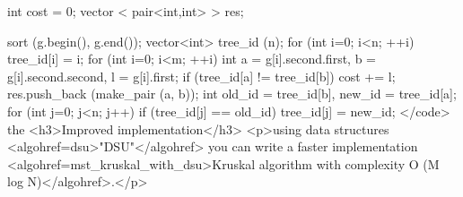int cost = 0;
vector < pair<int,int> > res;

sort (g.begin(), g.end());
vector<int> tree_id (n);
for (int i=0; i<n; ++i)
tree_id[i] = i;
for (int i=0; i<m; ++i)
{
int a = g[i].second.first, b = g[i].second.second, l = g[i].first;
if (tree_id[a] != tree_id[b])
{
cost += l;
res.push_back (make_pair (a, b));
int old_id = tree_id[b], new_id = tree_id[a];
for (int j=0; j<n; j++)
if (tree_id[j] == old_id)
tree_id[j] = new_id;
}
}</code>
the <h3>Improved implementation</h3>
<p>using data structures <algohref=dsu>"DSU"</algohref> you can write a faster implementation <algohref=mst_kruskal_with_dsu>Kruskal algorithm with complexity O (M log N)</algohref>.</p>